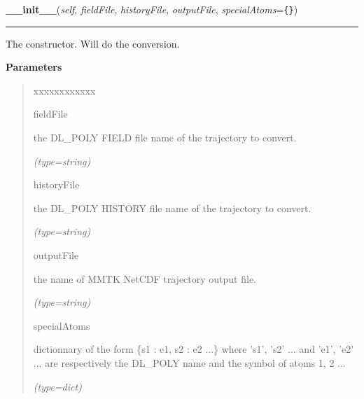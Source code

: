 \hspace{.8\funcindent}\begin{boxedminipage}{\funcwidth}

    \raggedright \textbf{\_\_init\_\_}(\textit{self}, \textit{fieldFile}, \textit{historyFile}, \textit{outputFile}, \textit{specialAtoms}={\tt \{\}})

    \vspace{-1.5ex}

    \rule{\textwidth}{0.5\fboxrule}
\setlength{\parskip}{2ex}
    The constructor. Will do the conversion.

\setlength{\parskip}{1ex}
      \textbf{Parameters}
      \vspace{-1ex}

      \begin{quote}
        \begin{Ventry}{xxxxxxxxxxxx}

          \item[fieldFile]

          the DL\_POLY FIELD file name of the trajectory to convert.

            {\it (type=string)}

          \item[historyFile]

          the DL\_POLY HISTORY file name of the trajectory to convert.

            {\it (type=string)}

          \item[outputFile]

          the name of MMTK NetCDF trajectory output file.

            {\it (type=string)}

          \item[specialAtoms]

          dictionnary of the form \{s1 : e1, s2 : e2 ...\} where 's1', 's2'
          ... and 'e1', 'e2' ... are respectively the DL\_POLY name and the
          symbol of atoms 1, 2 ...

            {\it (type=dict)}

        \end{Ventry}

      \end{quote}

    \end{boxedminipage}


